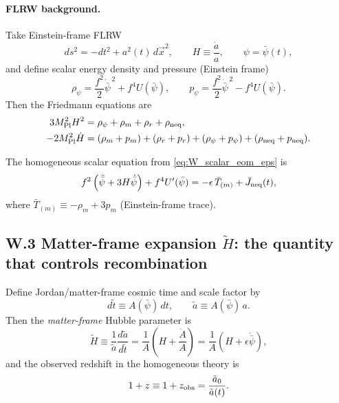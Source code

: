 \documentclass[10pt]{article}
\begin{document}
\paragraph{FLRW background.}
Take Einstein-frame FLRW
\begin{equation}
ds^2 = -dt^2 + a^2(t)\,d\vec x^2,
\qquad
H\equiv \frac{\dot a}{a},
\qquad
\psi=\bar\psi(t),
\label{eq:W_FLRW}
\end{equation}
and define scalar energy density and pressure (Einstein frame)
\begin{equation}
\rho_\psi = \frac{f^2}{2}\dot{\bar\psi}^{\,2} + f^4U(\bar\psi),
\qquad
p_\psi = \frac{f^2}{2}\dot{\bar\psi}^{\,2} - f^4U(\bar\psi).
\label{eq:W_rho_p_psi}
\end{equation}
Then the Friedmann equations are
\begin{align}
3M_{\rm Pl}^2H^2 &= \rho_\psi + \rho_m + \rho_r + \rho_{\rm neq},
\label{eq:W_friedmann1}\\
-2M_{\rm Pl}^2\dot H &= (\rho_m+p_m)+(\rho_r+p_r)+(\rho_\psi+p_\psi)+(\rho_{\rm neq}+p_{\rm neq}).
\label{eq:W_friedmann2}
\end{align}

The homogeneous scalar equation from \eqref{eq:W_scalar_eom_eps} is
\begin{equation}
f^2\left(\ddot{\bar\psi}+3H\dot{\bar\psi}\right)+f^4U'(\bar\psi)
=
-\epsilon\,\bar T_{(m)} + \bar J_{\rm neq}(t),
\label{eq:W_psi_background}
\end{equation}
where $\bar T_{(m)}\equiv -\rho_m+3p_m$ (Einstein-frame trace).

\subsection{W.3 Matter-frame expansion $\tilde H$: the quantity that controls recombination}
\label{app:early_universe:tildeH}

Define Jordan/matter-frame cosmic time and scale factor by
\begin{equation}
d\tilde t \equiv A(\bar\psi)\,dt,
\qquad
\tilde a \equiv A(\bar\psi)\,a.
\label{eq:W_tilde_defs}
\end{equation}
Then the \emph{matter-frame} Hubble parameter is
\begin{equation}
\tilde H
\equiv \frac{1}{\tilde a}\frac{d\tilde a}{d\tilde t}
=
\frac{1}{A}\left(H+\frac{\dot A}{A}\right)
=
\frac{1}{A}\left(H+\epsilon\dot{\bar\psi}\right),
\label{eq:W_tildeH}
\end{equation}
and the observed redshift in the homogeneous theory is
\begin{equation}
1+z \equiv 1+z_{\rm obs} = \frac{\tilde a_0}{\tilde a(t)}.
\label{eq:W_z_tildea}
\end{equation}
\end{document}
